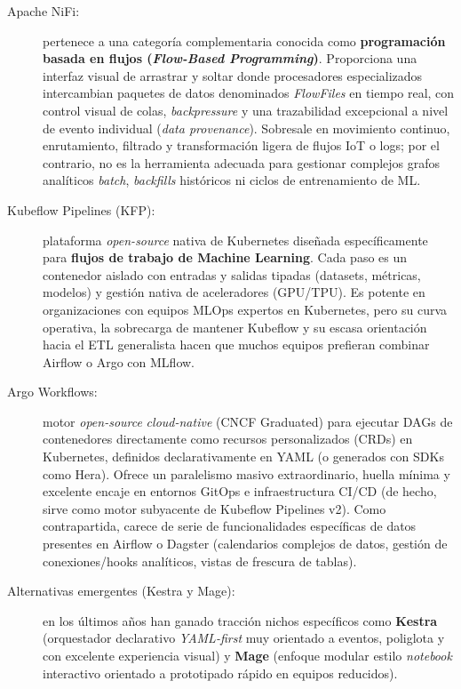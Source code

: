 \begin{description}
  \item[Apache NiFi:] pertenece a una categoría complementaria conocida como \textbf{programación basada en flujos (\textit{Flow-Based Programming})}. Proporciona una interfaz visual de arrastrar y soltar donde procesadores especializados intercambian paquetes de datos denominados \textit{FlowFiles} en tiempo real, con control visual de colas, \textit{backpressure} y una trazabilidad excepcional a nivel de evento individual (\textit{data provenance}). Sobresale en movimiento continuo, enrutamiento, filtrado y transformación ligera de flujos IoT o logs; por el contrario, no es la herramienta adecuada para gestionar complejos grafos analíticos \textit{batch}, \textit{backfills} históricos ni ciclos de entrenamiento de ML.

  \item[Kubeflow Pipelines (KFP):] plataforma \textit{open-source} nativa de Kubernetes diseñada específicamente para \textbf{flujos de trabajo de Machine Learning}. Cada paso es un contenedor aislado con entradas y salidas tipadas (datasets, métricas, modelos) y gestión nativa de aceleradores (GPU/TPU). Es potente en organizaciones con equipos MLOps expertos en Kubernetes, pero su curva operativa, la sobrecarga de mantener Kubeflow y su escasa orientación hacia el ETL generalista hacen que muchos equipos prefieran combinar Airflow o Argo con MLflow.

  \item[Argo Workflows:] motor \textit{open-source} \textit{cloud-native} (CNCF Graduated) para ejecutar DAGs de contenedores directamente como recursos personalizados (CRDs) en Kubernetes, definidos declarativamente en YAML (o generados con SDKs como Hera). Ofrece un paralelismo masivo extraordinario, huella mínima y excelente encaje en entornos GitOps e infraestructura CI/CD (de hecho, sirve como motor subyacente de Kubeflow Pipelines v2). Como contrapartida, carece de serie de funcionalidades específicas de datos presentes en Airflow o Dagster (calendarios complejos de datos, gestión de conexiones/hooks analíticos, vistas de frescura de tablas).

  \item[Alternativas emergentes (Kestra y Mage):] en los últimos años han ganado tracción nichos específicos como \textbf{Kestra} (orquestador declarativo \textit{YAML-first} muy orientado a eventos, poliglota y con excelente experiencia visual) y \textbf{Mage} (enfoque modular estilo \textit{notebook} interactivo orientado a prototipado rápido en equipos reducidos).


\end{description}
